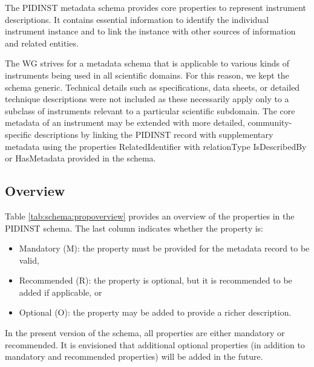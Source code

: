 \documentclass[titlepage=true,twoside=false,DIV=13]{scrartcl}
\begin{document}
The PIDINST metadata schema provides core properties to represent
instrument descriptions.  It contains essential information to
identify the individual instrument instance and to link the instance
with other sources of information and related entities.

The WG strives for a metadata schema that is applicable to various
kinds of instruments being used in all scientific domains.  For this
reason, we kept the schema generic.  Technical details such as
specifications, data sheets, or detailed technique descriptions were
not included as these necessarily apply only to a subclass of
instruments relevant to a particular scientific subdomain.  The core
metadata of an instrument may be extended with more detailed,
community-specific descriptions by linking the PIDINST record with
supplementary metadata using the properties RelatedIdentifier with
relationType IsDescribedBy or HasMetadata provided in the schema.

\subsection{Overview}

Table \ref{tab:schema:propoverview} provides an overview of the
properties in the PIDINST schema.  The last column indicates whether
the property is:
\begin{itemize}
\item Mandatory (M): the property must be provided for the metadata
  record to be valid,
\item Recommended (R): the property is optional, but it is recommended
  to be added if applicable, or
\item Optional (O): the property may be added to provide a richer
  description.
\end{itemize}
In the present version of the schema, all properties are either
mandatory or recommended.  It is envisioned that additional optional
properties (in addition to mandatory and recommended properties) will
be added in the future.
\end{document}
